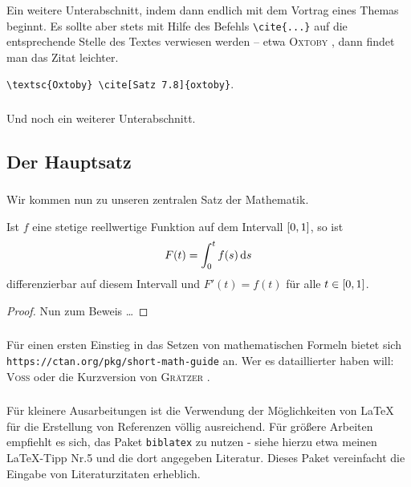 %
\subsubsection{} 
Ein weitere Unterabschnitt, indem dann endlich mit dem Vortrag eines Themas beginnt. 
Es sollte aber stets mit Hilfe des Befehls \verb|\cite{...}| auf die entsprechende Stelle des Textes verwiesen werden -- etwa \textsc{Oxtoby} \cite[Satz 7.8]{oxtoby}, dann findet man das Zitat leichter. 
%
\begin{center}
\verb|\textsc{Oxtoby} \cite[Satz 7.8]{oxtoby}|.
\end{center}
%
\subsubsection{} 
%
Und noch ein weiterer Unterabschnitt.
%
\subsection{Der Hauptsatz}
\subsubsection{}
Wir kommen nun zu unseren zentralen Satz der Mathematik.
%
\begin{theorem}\label{thm:hauptsatz}
%	
Ist $ f $ eine stetige reellwertige Funktion auf dem Intervall\/ $ \left[ 0,1 \right] $, so ist
%
\[
  	F( t ) = \int_{ 0 }^{ t } f(s) \mathop{}\!\mathrm{d}{s}
\]
%
differenzierbar auf diesem Intervall und $ F'(t) = f(t) $ für alle $ t \in  \left[ 0,1 \right] $.
\end{theorem}
%
\begin{proof}
Nun zum Beweis \ldots 
\end{proof}
%
\subsubsection{}
Für einen ersten Einstieg in das Setzen von mathematischen Formeln bietet sich \texttt{https://ctan.org/pkg/short-math-guide} an.
Wer es dataillierter haben will: \textsc{Voss} \cite{voss-math} oder die Kurzversion von \textsc{Grätzer} \cite{graetzer-ma}.

\subsubsection{}
Für kleinere Ausarbeitungen ist die Verwendung der Möglichkeiten von \LaTeX{} für die Erstellung von Referenzen völlig ausreichend.
Für größere Arbeiten empfiehlt es sich, das Paket \texttt{biblatex} zu nutzen - siehe hierzu etwa meinen \LaTeX{}-Tipp Nr.5 und die dort angegeben Literatur.
Dieses Paket vereinfacht die Eingabe von Literaturzitaten erheblich.
 
